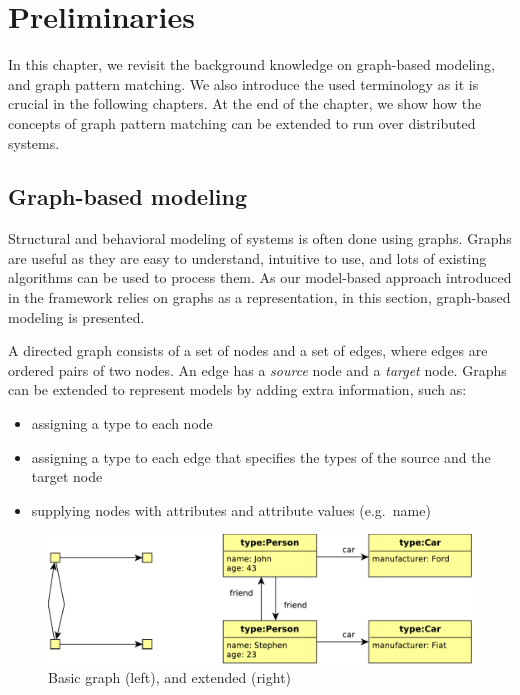 
\chapter{Preliminaries}

In this chapter, we revisit the background knowledge on graph-based modeling, and graph pattern matching. We also introduce the used terminology as it is crucial in the following chapters. At the end of the chapter, we show how the concepts of graph pattern matching can be extended to run over distributed systems.

\section{Graph-based modeling}

Structural and behavioral modeling of systems is often done using graphs. 
Graphs are useful as they are easy to understand, intuitive to use, and lots of existing algorithms can be used to process them. 
As our model-based approach introduced in the framework relies on graphs as a representation, in this section, graph-based modeling is presented.

A directed graph consists of a set of nodes and a set of edges, where edges are ordered pairs of two nodes. An edge has a \emph{source} node and a \emph{target} node. 
Graphs can be extended to represent models by adding extra information, such as:
\begin{itemize}
	\item assigning a type to each node
	\item assigning a type to each edge that specifies the types of the source and the target node
	\item supplying nodes with attributes and attribute values (e.g.\ name)
\end{itemize}


\begin{figure}[H]
	\begin{center}
		\includegraphics[width=\textwidth]{figures/graphs.pdf}
		\caption{Basic graph (left), and extended (right) }
		\label{fig:graphs}
	\end{center}
\end{figure}

